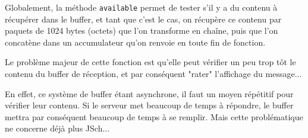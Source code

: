 \par Globalement, la méthode \texttt{available} permet de tester s'il y a du contenu à récupérer dans le buffer, et tant que c'est le cas, on récupère ce contenu par paquets de 1024 bytes (octets) que l'on transforme en chaîne, puis que l'on concatène dans un accumulateur qu'on renvoie en toute fin de fonction.

\par Le problème majeur de cette fonction est qu'elle peut vérifier un peu trop tôt le contenu du buffer de réception, et par conséquent "rater" l'affichage du message...

\par En effet, ce système de buffer étant asynchrone, il faut un moyen répétitif pour vérifier leur contenu. Si le serveur met beaucoup de temps à répondre, le buffer mettra par conséquent beaucoup de temps à se remplir. Mais cette problématique ne concerne déjà plus JSch...




